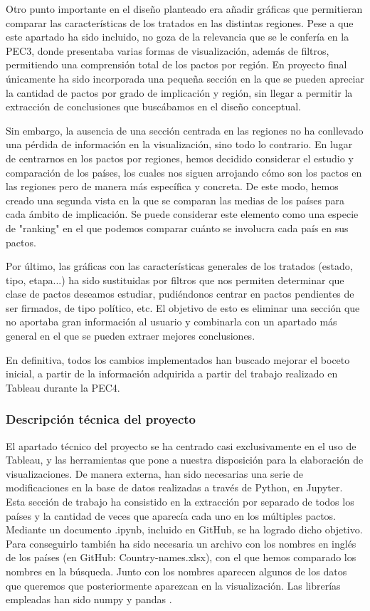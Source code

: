 \documentclass[11pt]{article}
\begin{document}
Otro punto importante en el diseño planteado era añadir gráficas que permitieran comparar las características de los tratados en las distintas regiones. Pese a que este apartado ha sido incluido, no goza de la relevancia que se le confería en la PEC3, donde presentaba varias formas de visualización, además de filtros, permitiendo una comprensión total de los pactos por región. En proyecto final únicamente ha sido incorporada una pequeña sección en la que se pueden apreciar la cantidad de pactos por grado de implicación y región, sin llegar a permitir la extracción de conclusiones que buscábamos en el diseño conceptual.

Sin embargo, la ausencia de una sección centrada en las regiones no ha conllevado una pérdida de información en la visualización, sino todo lo contrario. En lugar de centrarnos en los pactos por regiones, hemos decidido considerar el estudio y comparación de los países, los cuales nos siguen arrojando cómo son los pactos en las regiones pero de manera más específica y concreta. De este modo, hemos creado una segunda vista en la que se comparan las medias de los países para cada ámbito de implicación. Se puede considerar este elemento como una especie de "ranking" en el que podemos comparar cuánto se involucra cada país en sus pactos.

Por último, las gráficas con las características generales de los tratados (estado, tipo, etapa...) ha sido sustituidas por filtros que nos permiten determinar que clase de pactos deseamos estudiar, pudiéndonos centrar en pactos pendientes de ser firmados, de tipo político, etc. El objetivo de esto es eliminar una sección que no aportaba gran información al usuario y combinarla con un apartado más general en el que se pueden extraer mejores conclusiones.

En definitiva, todos los cambios implementados han buscado mejorar el boceto inicial, a partir de la información adquirida a partir del trabajo realizado en Tableau durante la PEC4.

\subsubsection{Descripción técnica del proyecto}

El apartado técnico del proyecto se ha centrado casi exclusivamente en el uso de Tableau, y las herramientas que pone a nuestra disposición para la elaboración de visualizaciones. De manera externa, han sido necesarias una serie de modificaciones en la base de datos realizadas a través de Python, en Jupyter. Esta sección de trabajo ha consistido en la extracción por separado de todos los países y la cantidad de veces que aparecía cada uno en los múltiples pactos. Mediante un documento .ipynb, incluido en GitHub, se ha logrado dicho objetivo. Para conseguirlo también ha sido necesaria un archivo con los nombres en inglés de los países (en GitHub: Country-names.xlsx), con el que hemos comparado los nombres en la búsqueda. Junto con los nombres aparecen algunos de los datos que queremos que posteriormente aparezcan en la visualización. Las librerías empleadas han sido numpy \cite{python} y pandas \cite{pandas}.
\end{document}
